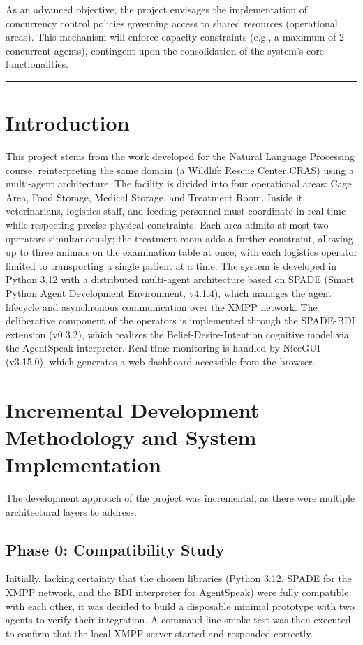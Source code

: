\documentclass{article}
\renewcommand{\_}{\oldtextunderscore\allowbreak}
\begin{document}
As an advanced objective, the project envisages the implementation of concurrency control policies governing access to shared resources (operational areas). This mechanism will enforce capacity constraints (e.g., a maximum of 2 concurrent agents), contingent upon the consolidation of the system's core functionalities.

\bigskip
\hrule
\bigskip

\section{Introduction}
This project stems from the work developed for the Natural Language Processing 
course, reinterpreting the same domain (a Wildlife Rescue Center CRAS)
using a multi-agent architecture. The facility is divided into four operational areas: 
Cage Area, Food Storage, Medical Storage, and Treatment Room. Inside it, 
veterinarians, logistics staff, and feeding personnel must coordinate in real 
time while respecting precise physical constraints. Each area admits at most 
two operators simultaneously; the treatment room adds a further constraint, 
allowing up to three animals on the examination table at once, with each 
logistics operator limited to transporting a single patient at a time.
The system is developed in Python 3.12 with a distributed multi-agent 
architecture based on SPADE (Smart Python Agent Development Environment, 
v4.1.4), which manages the agent lifecycle and asynchronous communication over 
the XMPP network. The deliberative component of the operators is implemented 
through the SPADE-BDI extension (v0.3.2), which realizes the 
Belief-Desire-Intention cognitive model via the AgentSpeak interpreter. 
Real-time monitoring is handled by NiceGUI (v3.15.0), which generates a 
web dashboard accessible from the browser.


\section{Incremental Development Methodology and System Implementation}
The development approach of the project was incremental, as there were multiple architectural layers to address.
\subsection{Phase 0: Compatibility Study}
Initially, lacking certainty that the chosen libraries (Python 3.12, SPADE for the XMPP network, and the BDI interpreter for AgentSpeak) were fully compatible with each other, it was decided to build a disposable minimal prototype with two agents to verify their integration. A command-line smoke test was then executed to confirm that the local XMPP server started and responded correctly.
\end{document}
